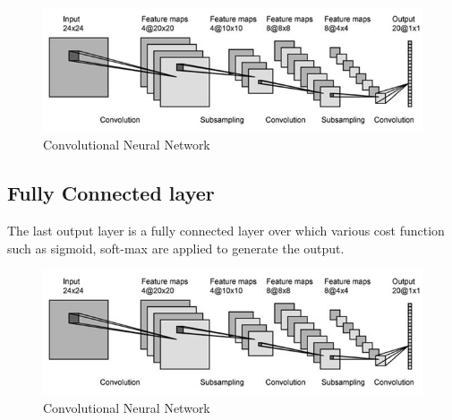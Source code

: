 \begin{figure}[H]
  \centering
    \includegraphics[scale=.6, angle=0]{Files/cnn-2.png}
    \caption[Convolutional Neural Network]{Convolutional Neural Network}
    \label{fig:CNN}
\end{figure}

\subsection{Fully Connected layer}
The last output layer is a fully connected layer over which various cost function such as sigmoid, soft-max are applied to generate the output.


\begin{figure}[H]
  \centering
    \includegraphics[scale=.6, angle=0]{Files/cnn-2.png}
    \caption[Convolutional Neural Network]{Convolutional Neural Network}
    \label{fig:CNN}
\end{figure}